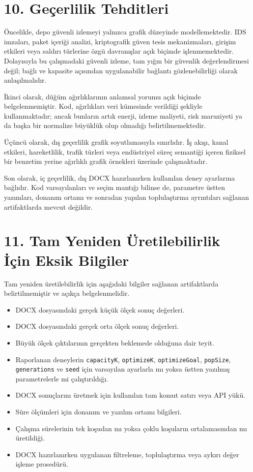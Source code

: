 \documentclass[11pt]{article}
\begin{document}
\section*{10. Geçerlilik Tehditleri}

Öncelikle, depo güvenli izlemeyi yalnızca grafik düzeyinde modellemektedir. IDS imzaları, paket içeriği analizi, kriptografik güven tesis mekanizmaları, girişim etkileri veya saldırı türlerine özgü davranışlar açık biçimde işlenmemektedir. Dolayısıyla bu çalışmadaki güvenli izleme, tam yığın bir güvenlik değerlendirmesi değil; bağlı ve kapasite açısından uygulanabilir bağlantı gözlenebilirliği olarak anlaşılmalıdır.

İkinci olarak, düğüm ağırlıklarının anlamsal yorumu açık biçimde belgelenmemiştir. Kod, ağırlıkları veri kümesinde verildiği şekliyle kullanmaktadır; ancak bunların artık enerji, izleme maliyeti, risk maruziyeti ya da başka bir normalize büyüklük olup olmadığı belirtilmemektedir.

Üçüncü olarak, dış geçerlilik grafik soyutlamasıyla sınırlıdır. İş akışı, kanal etkileri, hareketlilik, trafik türleri veya endüstriyel süreç semantiği içeren fiziksel bir benzetim yerine ağırlıklı grafik örnekleri üzerinde çalışmaktadır.

Son olarak, iç geçerlilik, dış DOCX hazırlanırken kullanılan deney ayarlarına bağlıdır. Kod varsayılanları ve seçim mantığı bilinse de, parametre üstten yazımları, donanım ortamı ve sonradan yapılan toplulaştırma ayrıntıları sağlanan artifaktlarda mevcut değildir.

\section*{11. Tam Yeniden Üretilebilirlik İçin Eksik Bilgiler}

Tam yeniden üretilebilirlik için aşağıdaki bilgiler sağlanan artifaktlarda belirtilmemiştir ve açıkça belgelenmelidir.

\begin{itemize}
    \item DOCX dosyasındaki gerçek küçük ölçek sonuç değerleri.
    \item DOCX dosyasındaki gerçek orta ölçek sonuç değerleri.
    \item Büyük ölçek çıktılarının gerçekten beklemede olduğuna dair teyit.
    \item Raporlanan deneylerin \texttt{capacityK}, \texttt{optimizeK}, \texttt{optimizeGoal}, \texttt{popSize}, \texttt{generations} ve \texttt{seed} için varsayılan ayarlarla mı yoksa üstten yazılmış parametrelerle mi çalıştırıldığı.
    \item DOCX sonuçlarını üretmek için kullanılan tam komut satırı veya API yükü.
    \item Süre ölçümleri için donanım ve yazılım ortamı bilgileri.
    \item Çalışma sürelerinin tek koşudan mı yoksa çoklu koşuların ortalamasından mı üretildiği.
    \item DOCX hazırlanırken uygulanan filtreleme, toplulaştırma veya aykırı değer işleme prosedürü.
\end{itemize}
\end{document}
